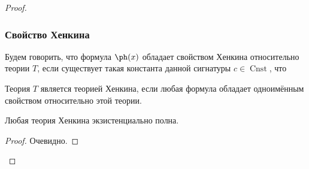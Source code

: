 \documentclass[a4paper,draft]{article}
\def\exis#1{\exi#1\,}
\DeclareMathOperator{\Cnst}{Cnst}
\begin{document}
\begin{proof}
\subsubsection{Свойство Хенкина}
\begin{df}
Будем говорить, что формула $\ph(x)$ обладает свойством Хенкина относительно теории $T$, если существует
такая константа данной сигнатуры $c\in\Cnst$, что
\equ{T\vdash\exis x\ph(x)\ra\ph(c).}
\end{df}
\begin{df}
Теория $T$ является теорией Хенкина, если любая формула обладает одноимённым свойством относительно этой теории.
\end{df}
\begin{lemma}
Любая теория Хенкина экзистенциально полна.
\end{lemma}
\begin{proof}
Очевидно.
\end{proof}

\end{proof}
\end{document}
